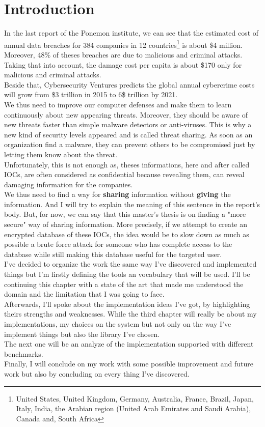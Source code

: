 \documentclass{eplmastersthesis}
\begin{document}
\section{Introduction}
In the last report of the Ponemon institute, we can see that the estimated cost of annual data breaches for 384 companies in 12 countries\footnote{United States, United Kingdom, Germany, Australia, France, Brazil, Japan, Italy, India, the Arabian region (United Arab Emirates and Saudi Arabia), Canada and, South Africa} is about \$4 million. Moreover, 48\% of theses breaches are due to malicious and criminal attacks.\\
Taking that into account, the damage cost per capita is about \$170 only for malicious and criminal attacks. \\
Beside that, Cybersecurity Ventures predicts the global annual cybercrime costs will grow from \$3 trillion in 2015 to 6\$ trillion by 2021.\\

We thus need to improve our computer defenses and make them to learn continuously about new appearing threats. Moreover, they should be aware of new threats faster than simple malware detectors or anti-viruses. This is why a new kind of security levels appeared and is called threat sharing. As soon as an organization find a malware, they can prevent others to be compromised just by letting them know about the threat. \\
Unfortunately, this is not enough as, theses informations, here and after called IOCs, are often considered as confidential because revealing them, can reveal damaging information for the companies.\\
We thus need to find a way for \textbf{sharing} information without \textbf{giving} the information. And I will try to explain the meaning of this sentence in the report's body. But, for now, we can say that this master's thesis is on finding a "more secure" way of sharing information. More precisely, if we attempt to create an encrypted database of these IOCs, the idea would be to slow down as much as possible a brute force attack for someone who has complete access to the database while still making this database useful for the targeted user.\\

I've decided to organize the work the same way I've discovered and implemented things but I'm firstly defining the tools an vocabulary that will be used. I'll be continuing this chapter with a state of the art that made me understood the domain and the limitation that I was going to face.\\
Afterwards, I'll spoke about the implementation ideas I've got, by highlighting theirs strengths and weaknesses. While the third chapter will really be about my implementations, my choices on the system but not only on the way I've implement things but also the library I've chosen.\\
The next one will be an analyze of the implementation supported with different benchmarks.\\
Finally, I will conclude on my work with some possible improvement and future work but also by concluding on every thing I've discovered.
\end{document}
